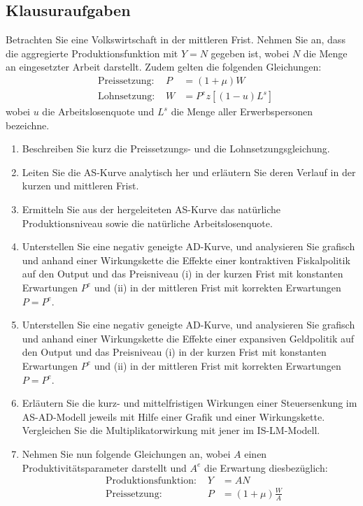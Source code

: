 \documentclass{scrartcl}
\begin{document}
\subsection{Klausuraufgaben}
Betrachten Sie eine Volkswirtschaft in der mittleren Frist. Nehmen Sie an, dass die aggregierte Produktionsfunktion mit $Y = N$ gegeben ist, wobei $N$ die Menge an eingesetzter Arbeit darstellt. Zudem gelten die folgenden Gleichungen:
\begin{align}
  &\text{Preissetzung: }& P &= (1+\mu)W\\
  &\text{Lohnsetzung: }& W &=P^e z[(1-u)L^s]
\end{align}
wobei $u$ die Arbeitslosenquote und $L^s$ die Menge aller Erwerbspersonen bezeichne.
\begin{enumerate}
  \item Beschreiben Sie kurz die Preissetzungs- und die Lohnsetzungsgleichung.
  \item Leiten Sie die AS-Kurve analytisch her und erl\"{a}utern Sie deren Verlauf in der kurzen und mittleren Frist.
  \item Ermitteln Sie aus der hergeleiteten AS-Kurve das nat\"{u}rliche Produktionsniveau sowie die nat\"{u}rliche Arbeitslosenquote.
  \item Unterstellen Sie eine negativ geneigte AD-Kurve, und analysieren Sie grafisch und anhand einer Wirkungskette die Effekte einer kontraktiven Fiskalpolitik auf den Output und das Preisniveau (i) in der kurzen Frist mit konstanten Erwartungen $P^e$ und (ii) in der mittleren Frist mit korrekten Erwartungen $P=P^e$.
    \item Unterstellen Sie eine negativ geneigte AD-Kurve, und analysieren Sie grafisch und anhand einer Wirkungskette die Effekte einer expansiven Geldpolitik auf den Output und das Preisniveau (i) in der kurzen Frist mit konstanten Erwartungen $P^e$ und (ii) in der mittleren Frist mit korrekten Erwartungen $P=P^e$.
    \item Erläutern Sie die kurz- und mittelfristigen Wirkungen einer Steuersenkung im AS-AD-Modell jeweils mit Hilfe einer Grafik und einer Wirkungskette. Vergleichen Sie die Multiplikatorwirkung mit jener im IS-LM-Modell.
    \item Nehmen Sie nun folgende Gleichungen an, wobei $A$ einen Produktivit\"{a}tsparameter darstellt und $A^e$ die Erwartung diesbez\"{u}glich:
    \begin{align}
  &\text{Produktionsfunktion: }& Y &= AN\\
  &\text{Preissetzung: }& P &= (1+\mu)\frac{W}{A}\\

\end{align}
\end{enumerate}
\end{document}
